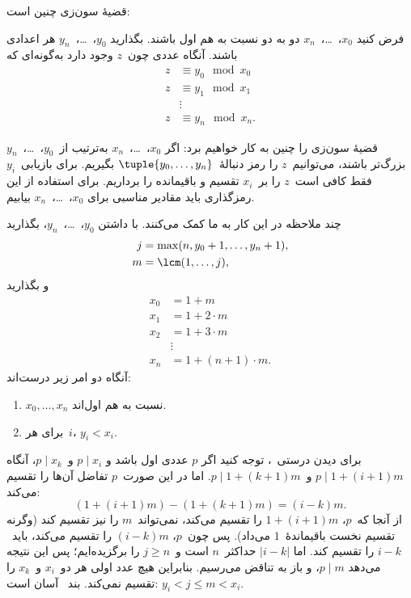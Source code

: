 \documentclass[../../../include/open-logic-section]{subfiles}
\begin{document}
قضیهٔ سون‌زی چنین است:
\begin{thm}
فرض کنید $x_0$،~\dots،~$x_n$ دو به دو نسبت به هم اول باشند. بگذارید
$y_0$،~\dots،~$y_n$ هر اعدادی باشند. آنگاه عددی چون~$z$ وجود دارد
به‌گونه‌ای که
\begin{align*}
z & \equiv y_0 \mod x_0 \\
z & \equiv y_1 \mod x_1 \\
& \vdots  \\
z & \equiv y_n \mod x_n.
\end{align*}
\end{thm}

قضیهٔ سون‌زی را چنین به کار خواهیم برد: اگر
$x_0$،~\dots،~$x_n$ به‌ترتیب از~$y_0$،~\dots،~$y_n$ بزرگ‌تر باشند،
می‌توانیم~$z$ را رمز دنبالهٔ~$\tuple{y_0,\dots,y_n}$ بگیریم. برای
بازیابی~$y_i$ فقط کافی است~$z$ را بر~$x_i$ تقسیم و باقیمانده را
برداریم. برای استفاده از این رمزگذاری باید مقادیر مناسبی برای
$x_0$،~\dots،~$x_n$ بیابیم.

چند ملاحظه در این کار به ما کمک می‌کنند. با داشتن
$y_0$،~\dots،~$y_n$، بگذارید
\begin{align*}
j &= \max(n, y_0 + 1, \dots, y_n + 1), \\
m &= \lcm(1,\dots,j),
\end{align*}
و بگذارید
\begin{align*}
x_0 & = 1 + m \\
x_1 & = 1 + 2 \cdot m \\
x_2 & = 1 + 3 \cdot m \\
& \vdots  \\
x_n & = 1 + (n+1) \cdot m.
\end{align*}
آنگاه دو امر زیر درست‌اند:
\begin{enumerate}
\item{} $x_0,\dots,x_n$ نسبت به هم اول‌اند.
\item{} برای هر~$i$، $y_i<x_i$.
\end{enumerate}
برای دیدن درستی~، توجه کنید اگر $p$ عددی اول باشد و
$p\mid x_i$ و~$p\mid x_k$، آنگاه
$p\mid 1+(i+1)m$ و~$p\mid 1+(k+1)m$. اما در این صورت~$p$ تفاضل
آن‌ها را تقسیم می‌کند:
\[
(1 + (i+1)m) - (1+ (k+1)m) = (i-k) m.
\]
از آنجا که~$p$، $1+(i+1)m$ را تقسیم می‌کند، نمی‌تواند~$m$ را نیز
تقسیم کند (وگرنه تقسیم نخست باقیماندهٔ~$1$ می‌داد). پس چون~$p$،
$(i-k)m$ را تقسیم می‌کند، باید~$i-k$ را تقسیم کند. اما
$\left|i-k\right|$ حداکثر~$n$ است و~$j\geq n$ را برگزیده‌ایم؛ پس
این نتیجه می‌دهد $p\mid m$، و باز به تناقض می‌رسیم. بنابراین هیچ عدد
اولی هر دو~$x_i$ و~$x_k$ را تقسیم نمی‌کند. بند~ آسان است:
$y_i<j\leq m<x_i$.
\end{document}
